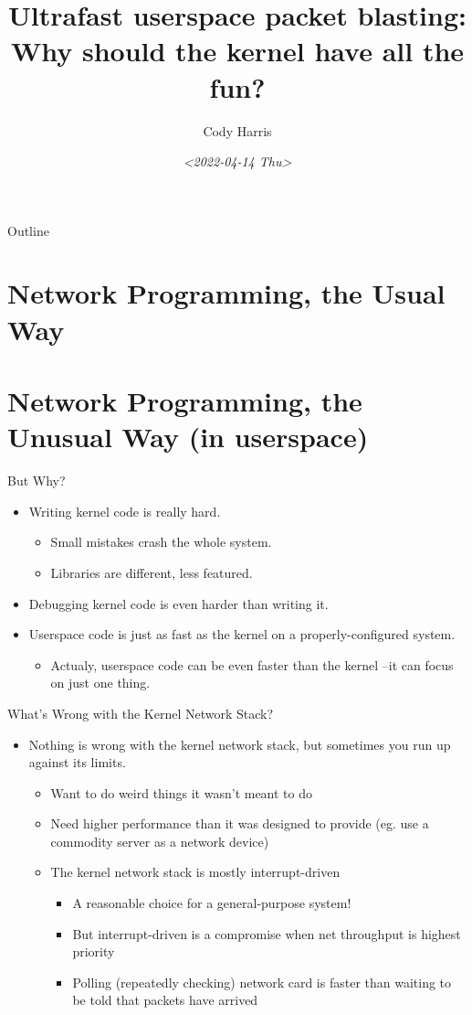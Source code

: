 \documentclass[presentation]{beamer}
\author{Cody Harris}
\date{\textit{<2022-04-14 Thu>}}
\title{Ultrafast userspace packet blasting: Why should the kernel have all the fun?}
\begin{document}
\maketitle
\begin{frame}{Outline}
\tableofcontents
\end{frame}


\section{Network Programming, the Usual Way}
\label{sec:orgb6d1f38}

\section{Network Programming, the Unusual Way (in userspace)}
\label{sec:org84fcd63}
\begin{frame}[label={sec:org375ef4f}]{But Why?}
\begin{itemize}
\item Writing kernel code is really hard.
\begin{itemize}
\item Small mistakes crash the whole system.
\item Libraries are different, less featured.
\end{itemize}
\item Debugging kernel code is even harder than writing it.
\item Userspace code is just as fast as the kernel on a properly-configured system.
\begin{itemize}
\item Actualy, userspace code can be even faster than the kernel --it can focus on just one thing.
\end{itemize}
\end{itemize}
\end{frame}
\begin{frame}[label={sec:org74ee6b4}]{What's Wrong with the Kernel Network Stack?}
\begin{itemize}
\item Nothing is wrong with the kernel network stack, but sometimes you
run up against its limits.
\begin{itemize}
\item Want to do weird things it wasn't meant to do
\item Need higher performance than it was designed to provide (eg.
use a commodity server as a network device)
\item The kernel network stack is mostly interrupt-driven
\begin{itemize}
\item A reasonable choice for a general-purpose system!
\item But interrupt-driven is a compromise when net throughput is
highest priority
\item Polling (repeatedly checking) network card is faster than
waiting to be told that packets have arrived
\end{itemize}
\end{itemize}
\end{itemize}
\end{frame}
\end{document}
